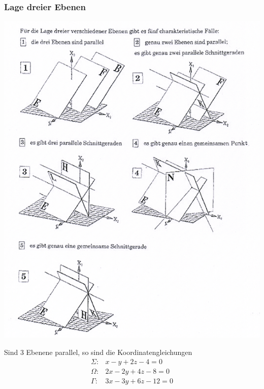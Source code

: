 \subsubsection{Lage dreier Ebenen}
\begin{center}
	 \includegraphics[width=\textwidth]{imgs/lage_drei_ebenen.png}
 \end{center}
 Sind 3 Ebenene parallel, so sind die Koordinatengleichungen
 \begin{eqnarray*}
 	\Sigma:& x-y+2z-4=0\\
 	\Omega: &2x-2y+4z -8 = 0\\
 	\Gamma: &3x-3y+6z-12=0
 \end{eqnarray*}
